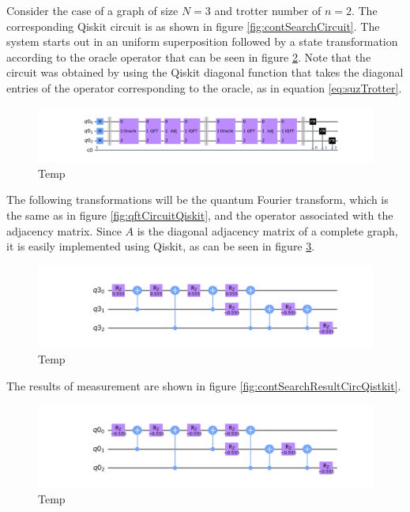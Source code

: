 \documentclass[../../dissertation.tex]{subfiles}
\begin{document}
Consider the case of a graph of size $N=3$ and trotter number of $n=2$. The corresponding Qiskit circuit is as shown in figure \ref{fig:contSearchCircuit}. The system starts out in an uniform superposition followed by a state transformation according to the oracle operator that can be seen in figure \ref{fig:contSearchOracleCircQistkit}. Note that the circuit was obtained by using the Qiskit diagonal function that takes the diagonal entries of the operator corresponding to the oracle, as in equation \ref{eq:suzTrotter}. 
\begin{figure}[!h]
	\centering
	\includegraphics[scale=0.34]{img/Qiskit/ContQuantumWalk/Search/Circuits/circContSearch_N3_S2.png}
	\caption{Temp}
	\label{fig:contSearchCircQistkit}
\end{figure}
The following transformations will be the quantum Fourier transform, which is the same as in figure \ref{fig:qftCircuitQiskit}, and the operator associated with the adjacency matrix. Since $A$ is the diagonal adjacency matrix of a complete graph, it is easily implemented using Qiskit, as can be seen in figure \ref{fig:contSearchAdjCircQistkit}.
\begin{figure}[!h]
	\centering
	\includegraphics[scale=0.34]{img/Qiskit/ContQuantumWalk/Search/Circuits/circOracle_N3_S2.png}
	\caption{Temp}
	\label{fig:contSearchOracleCircQistkit}
\end{figure}
\par
The results of measurement are shown in figure \ref{fig:contSearchResultCircQistkit}. 

\begin{figure}[!h]
	\centering
	\includegraphics[scale=0.34]{img/Qiskit/ContQuantumWalk/Search/Circuits/circAjd_N3_S2.png}
	\caption{Temp}
	\label{fig:contSearchAdjCircQistkit}
\end{figure}
\end{document}
